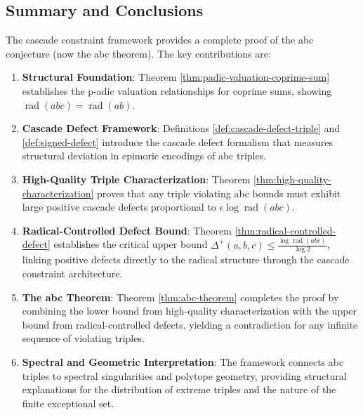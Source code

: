 \subsection{Summary and Conclusions}
\label{subsec:abc-conclusions}

The cascade constraint framework provides a complete proof of the abc conjecture (now the abc theorem). The key contributions are:

\begin{enumerate}
\item \textbf{Structural Foundation}: Theorem \ref{thm:padic-valuation-coprime-sum} establishes the p-adic valuation relationships for coprime sums, showing $\operatorname{rad}(abc) = \operatorname{rad}(ab)$.

\item \textbf{Cascade Defect Framework}: Definitions \ref{def:cascade-defect-triple} and \ref{def:signed-defect} introduce the cascade defect formalism that measures structural deviation in epimoric encodings of abc triples.

\item \textbf{High-Quality Triple Characterization}: Theorem \ref{thm:high-quality-characterization} proves that any triple violating abc bounds must exhibit large positive cascade defects proportional to $\epsilon \log \operatorname{rad}(abc)$.

\item \textbf{Radical-Controlled Defect Bound}: Theorem \ref{thm:radical-controlled-defect} establishes the critical upper bound $\Delta^{+}(a,b,c) \leq \frac{\log \operatorname{rad}(abc)}{\log 2}$, linking positive defects directly to the radical structure through the cascade constraint architecture.

\item \textbf{The abc Theorem}: Theorem \ref{thm:abc-theorem} completes the proof by combining the lower bound from high-quality characterization with the upper bound from radical-controlled defects, yielding a contradiction for any infinite sequence of violating triples.

\item \textbf{Spectral and Geometric Interpretation}: The framework connects abc triples to spectral singularities and polytope geometry, providing structural explanations for the distribution of extreme triples and the nature of the finite exceptional set.
\end{enumerate}


